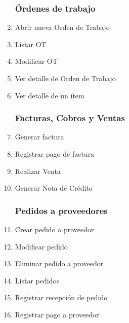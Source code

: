 \documentclass[12pt]{extarticle}
\begin{document}
\begin{spacing}{1.2}
\begin{multicols}{2}
\begin{enumerate}
            \subsubsection*{Órdenes de trabajo}
            \item Abrir nueva Orden de Trabajo
            \item Listar OT
            \item Modificar OT 
            \item Ver detalle de Orden de Trabajo
            \item Ver detalle de un ítem
            \subsubsection*{Facturas, Cobros y Ventas}
            \item Generar factura 
            \item Registrar pago de factura
            \item Realizar Venta
            \item Generar Nota de Crédito
            \subsubsection*{Pedidos a proveedores}
            \item Crear pedido a proveedor
            \item Modificar pedido %
            \item Eliminar pedido a proveedor
            \item Listar pedidos
            \item Registrar recepción de pedido
            \item Registrar pago a proveedor
        \end{enumerate}
        \end{multicols}

        \clearpage


\end{spacing}
\end{document}
